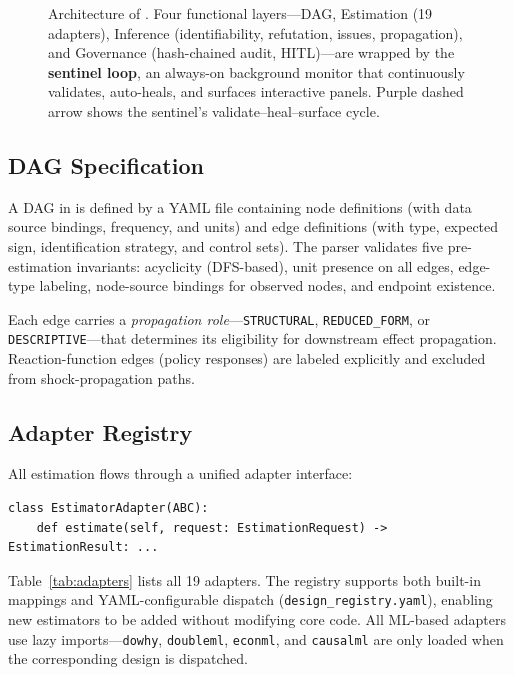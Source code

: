 \documentclass{article}
\begin{document}
\begin{figure}[t]
    \caption{Architecture of \oc{}. Four functional layers---DAG, Estimation (19 adapters), Inference (identifiability, refutation, issues, propagation), and Governance (hash-chained audit, HITL)---are wrapped by the \textbf{sentinel loop}, an always-on background monitor that continuously validates, auto-heals, and surfaces interactive panels. Purple dashed arrow shows the sentinel's validate--heal--surface cycle.}
    \label{fig:architecture}
\end{figure}

\subsection{DAG Specification}
\label{sec:dag}

A DAG in \oc{} is defined by a YAML file containing node definitions (with data source bindings, frequency, and units) and edge definitions (with type, expected sign, identification strategy, and control sets). The parser validates five pre-estimation invariants: acyclicity (DFS-based), unit presence on all edges, edge-type labeling, node-source bindings for observed nodes, and endpoint existence.

Each edge carries a \emph{propagation role}---\texttt{STRUCTURAL}, \texttt{REDUCED\_FORM}, or \texttt{DESCRIPTIVE}---that determines its eligibility for downstream effect propagation. Reaction-function edges (policy responses) are labeled explicitly and excluded from shock-propagation paths.

\subsection{Adapter Registry}
\label{sec:adapters}

All estimation flows through a unified adapter interface:

\begin{lstlisting}
class EstimatorAdapter(ABC):
    def estimate(self, request: EstimationRequest) -> EstimationResult: ...
\end{lstlisting}

Table~\ref{tab:adapters} lists all 19 adapters. The registry supports both built-in mappings and YAML-configurable dispatch (\texttt{design\_registry.yaml}), enabling new estimators to be added without modifying core code. All ML-based adapters use lazy imports---\texttt{dowhy}, \texttt{doubleml}, \texttt{econml}, and \texttt{causalml} are only loaded when the corresponding design is dispatched.
\end{document}
